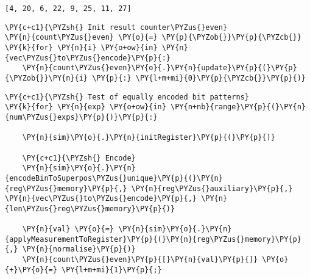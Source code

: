             \begin{tcolorbox}[breakable, boxrule=.5pt, size=fbox, pad at break*=1mm, opacityfill=0]
\begin{Verbatim}[commandchars=\\\{\}]
[4, 20, 6, 22, 9, 25, 11, 27]
\end{Verbatim}
\end{tcolorbox}
        
    \begin{tcolorbox}[breakable, size=fbox, boxrule=1pt, pad at break*=1mm,colback=cellbackground, colframe=cellborder]
\begin{Verbatim}[commandchars=\\\{\}]
\PY{c+c1}{\PYZsh{} Init result counter\PYZus{}even}
\PY{n}{count\PYZus{}even} \PY{o}{=} \PY{p}{\PYZob{}}\PY{p}{\PYZcb{}}
\PY{k}{for} \PY{n}{i} \PY{o+ow}{in} \PY{n}{vec\PYZus{}to\PYZus{}encode}\PY{p}{:}
    \PY{n}{count\PYZus{}even}\PY{o}{.}\PY{n}{update}\PY{p}{(}\PY{p}{\PYZob{}}\PY{n}{i} \PY{p}{:} \PY{l+m+mi}{0}\PY{p}{\PYZcb{}}\PY{p}{)}
\end{Verbatim}
\end{tcolorbox}

    \begin{tcolorbox}[breakable, size=fbox, boxrule=1pt, pad at break*=1mm,colback=cellbackground, colframe=cellborder]
\begin{Verbatim}[commandchars=\\\{\}]
\PY{c+c1}{\PYZsh{} Test of equally encoded bit patterns}
\PY{k}{for} \PY{n}{exp} \PY{o+ow}{in} \PY{n+nb}{range}\PY{p}{(}\PY{n}{num\PYZus{}exps}\PY{p}{)}\PY{p}{:}

    \PY{n}{sim}\PY{o}{.}\PY{n}{initRegister}\PY{p}{(}\PY{p}{)}

    \PY{c+c1}{\PYZsh{} Encode}
    \PY{n}{sim}\PY{o}{.}\PY{n}{encodeBinToSuperpos\PYZus{}unique}\PY{p}{(}\PY{n}{reg\PYZus{}memory}\PY{p}{,} \PY{n}{reg\PYZus{}auxiliary}\PY{p}{,} \PY{n}{vec\PYZus{}to\PYZus{}encode}\PY{p}{,} \PY{n}{len\PYZus{}reg\PYZus{}memory}\PY{p}{)}
    
    \PY{n}{val} \PY{o}{=} \PY{n}{sim}\PY{o}{.}\PY{n}{applyMeasurementToRegister}\PY{p}{(}\PY{n}{reg\PYZus{}memory}\PY{p}{,} \PY{n}{normalise}\PY{p}{)}
    \PY{n}{count\PYZus{}even}\PY{p}{[}\PY{n}{val}\PY{p}{]} \PY{o}{+}\PY{o}{=} \PY{l+m+mi}{1}\PY{p}{;}
\end{Verbatim}
\end{tcolorbox}

